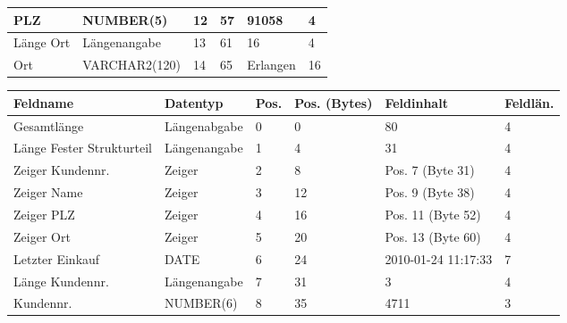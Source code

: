 \begin{enumerate}[a)]
\begin{solution}
{\begin{tabular}{p{2.8cm}lllll}
		PLZ                       & NUMBER(5)         & 12            & 57                    & 91058                              & 4                 \\ \hline
		Länge Ort                 & Längenangabe      & 13            & 61                    & 16                                 & 4                 \\ \hline
		Ort                       & VARCHAR2(120)     & 14            & 65                    & Erlangen                           & 16                \\ \hline
	\end{tabular}}

{\small
	\begin{tabular}{p{2.8cm}lllll}
		\hline\hline
		\textbf{Feldname}         & \textbf{Datentyp} & \textbf{Pos.} & \textbf{Pos. (Bytes)} & \textbf{Feldinhalt}                & \textbf{Feldlän.} \\ \hline\hline
		Gesamtlänge               & Längenabgabe      & 0             & 0                     & 80                                 & 4                 \\ \hline
		Länge Fester Strukturteil & Längenangabe      & 1             & 4                     & 31                                 & 4                 \\ \hline
		Zeiger Kundennr.          & Zeiger            & 2             & 8                     & Pos. 7 (Byte 31)                   & 4                 \\ \hline
		Zeiger Name               & Zeiger            & 3             & 12                    & Pos. 9 (Byte 38)                   & 4                 \\ \hline
		Zeiger PLZ                & Zeiger            & 4             & 16                    & Pos. 11 (Byte 52)                  & 4                 \\ \hline
		Zeiger Ort                & Zeiger            & 5             & 20                    & Pos. 13 (Byte 60)                  & 4                 \\ \hline
		Letzter Einkauf           & DATE              & 6             & 24                    & \footnotesize{2010-01-24 11:17:33} & 7                 \\ \hline
		Länge Kundennr.           & Längenangabe      & 7             & 31                    & 3                                  & 4                 \\ \hline
		Kundennr.                 & NUMBER(6)         & 8             & 35                    & 4711                               & 3                 \\ \hline

\end{tabular}}
\end{solution}
\end{enumerate}
